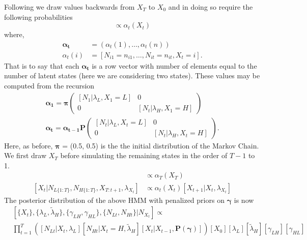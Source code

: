 \documentclass[smallextended]{svjour3}       %
\begin{document}
Following \cite{Zucchini2009a} we draw values backwards from $X_T$ to $X_0$ and in doing so require the following probabilities
\begin{equation}
[X_t | N_{L\{1:t\}}, N_{H\{1:t\}}, \lambda_{X_t}] \propto \alpha_t(X_t)
\label{e:startFB}
\end{equation}
where, 
\begin{align}
\bm{\alpha_t} &= (\alpha_t(1), \dots, \alpha_t(n))\\
\alpha_t(i) &= [N_{i1} = n_{i1}, \dots, N_{it} = n_{it}, X_t = i].
\end{align}
That is to say that each $\bm{\alpha_t}$ is a row vector with number of elements equal to the number of latent states (here we are considering two states).  These values may be computed from the recursion
\begin{align}
\bm{\alpha_1} = \bm{\pi} \begin{pmatrix}
[N_1|\lambda_{L}, X_1 = L] & 0\\
0 & [N_t | \lambda_{H}, X_1 = H]
\end{pmatrix}  \\
\bm{\alpha_t = \alpha_{t - 1}}\mathbf{P}\begin{pmatrix}
[N_t|\lambda_{L}, X_t = L] & 0\\
0 & [N_t | \lambda_{H}, X_t = H]
\end{pmatrix} .
\end{align}
Here, as before, $\bm{\pi}$ = (0.5, 0.5) is the the initial distribution of the Markov Chain. We first draw $X_T$ before simulating the remaining states in the order of $T - 1$ to 1. 
\begin{align}
[X_T | N_{L\{1:T\}}, N_{H\{1:T\}}, \lambda_{X_T}] &\propto \alpha_T(X_T)\\
[X_t | N_{L\{1:T\}}, N_{H\{1:T\}}, X_{T:t+1}, \lambda_{X_t}] &\propto \alpha_t(X_t) [X_{t+1} | X_t, \lambda_{X_t}]
\label{e:endFB}
\end{align}
The posterior distribution of the above HMM with penalized priors on $\bm{\gamma}$ is now
\begin{equation}
\begin{aligned}
 &[\{X_t\}, \{\lambda_L, \tilde{\lambda}_H\}, \{\gamma_{LH}, \gamma_{HL}\}, \{N_{Lt}, N_{Ht}\} | N_{X_t} ] \propto \\
 &\prod_{t = 1}^T \left( [N_{Lt} | X_t, \lambda_L] [N_{Ht} | X_t = H,  \tilde{\lambda}_H] [X_t | X_{t-1}, \mathbf{P}(\bm{\gamma})] \right) [X_0] [\lambda_L] [\tilde{\lambda}_H] [\gamma_{LH}][\gamma_{HL}]
\end{aligned}
\end{equation}
\end{document}
